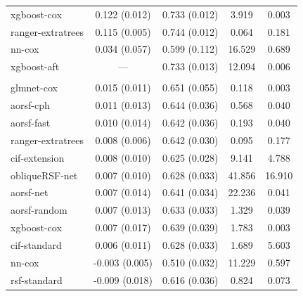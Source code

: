 \documentclass{article}\usepackage[]{graphicx}\usepackage[]{xcolor}
\newenvironment{knitrout}{}{} %
\begin{document}
\begin{knitrout}
\begin{longtable}[t]{lcccc}
\hspace{1em}xgboost-cox & 0.122 (0.012) & 0.733 (0.012) & 3.919 & 0.003\\
\hspace{1em}ranger-extratrees & 0.115 (0.005) & 0.744 (0.012) & 0.064 & 0.181\\
\hspace{1em}nn-cox & 0.034 (0.057) & 0.599 (0.112) & 16.529 & 0.689\\
\hspace{1em}xgboost-aft & --- & 0.733 (0.013) & 12.094 & 0.006\\
\addlinespace[0.3em]
\multicolumn{5}{l}{\textit{\textbf{Monoclonal gammopathy; malignancy, n = 1384, p = 8}}}\\
\hline
\hspace{1em}glmnet-cox & 0.015 (0.011) & 0.651 (0.055) & 0.118 & 0.003\\
\hspace{1em}aorsf-cph & 0.011 (0.013) & 0.644 (0.036) & 0.568 & 0.040\\
\hspace{1em}aorsf-fast & 0.010 (0.014) & 0.642 (0.036) & 0.193 & 0.040\\
\hspace{1em}ranger-extratrees & 0.008 (0.006) & 0.642 (0.030) & 0.095 & 0.177\\
\hspace{1em}cif-extension & 0.008 (0.010) & 0.625 (0.028) & 9.141 & 4.788\\
\hspace{1em}obliqueRSF-net & 0.007 (0.010) & 0.628 (0.033) & 41.856 & 16.910\\
\hspace{1em}aorsf-net & 0.007 (0.014) & 0.641 (0.034) & 22.236 & 0.041\\
\hspace{1em}aorsf-random & 0.007 (0.013) & 0.633 (0.033) & 1.329 & 0.039\\
\hspace{1em}xgboost-cox & 0.007 (0.017) & 0.639 (0.039) & 1.783 & 0.003\\
\hspace{1em}cif-standard & 0.006 (0.011) & 0.628 (0.033) & 1.689 & 5.603\\
\hspace{1em}nn-cox & -0.003 (0.005) & 0.510 (0.032) & 11.229 & 0.597\\
\hspace{1em}rsf-standard & -0.009 (0.018) & 0.616 (0.036) & 0.824 & 0.073\\

\end{longtable}
\end{knitrout}
\end{document}
